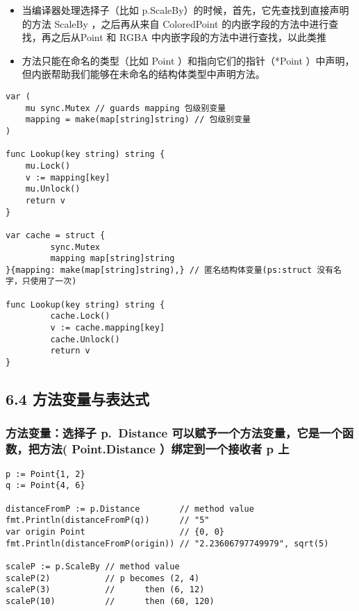 \begin{itemize}
\item
  当编译器处理选择子（比如
  p.ScaleBy）的时候，首先，它先查找到直接声明的方法 ScaleBy
  ，之后再从来自 ColoredPoint 的内嵌字段的方法中进行查找，再之后从Point
  和 RGBA 中内嵌字段的方法中进行查找，以此类推
\item
  方法只能在命名的类型（比如 Point ）和指向它们的指针（*Point
  ）中声明，但内嵌帮助我们能够在未命名的结构体类型中声明方法。
\end{itemize}

\begin{verbatim}
var (
    mu sync.Mutex // guards mapping 包级别变量
    mapping = make(map[string]string) // 包级别变量
)

func Lookup(key string) string {
    mu.Lock()
    v := mapping[key]
    mu.Unlock()
    return v
}

var cache = struct {
         sync.Mutex
         mapping map[string]string 
}{mapping: make(map[string]string),} // 匿名结构体变量(ps:struct 没有名字，只使用了一次)
         
func Lookup(key string) string {
         cache.Lock()
         v := cache.mapping[key]
         cache.Unlock()
         return v
}
\end{verbatim}

\hypertarget{ux65b9ux6cd5ux53d8ux91cfux4e0eux8868ux8fbeux5f0f}{%
\subsection{6.4
方法变量与表达式}\label{ux65b9ux6cd5ux53d8ux91cfux4e0eux8868ux8fbeux5f0f}}

\hypertarget{ux65b9ux6cd5ux53d8ux91cfux9009ux62e9ux5b50-p.distance-ux53efux4ee5ux8d4bux4e88ux4e00ux4e2aux65b9ux6cd5ux53d8ux91cfux5b83ux662fux4e00ux4e2aux51fdux6570ux628aux65b9ux6cd5-point.distance-ux7ed1ux5b9aux5230ux4e00ux4e2aux63a5ux6536ux8005-p-ux4e0a}{%
\subsubsection{方法变量：选择子 p.~Distance
可以赋予一个方法变量，它是一个函数，把方法( Point.Distance
）绑定到一个接收者 p
上}\label{ux65b9ux6cd5ux53d8ux91cfux9009ux62e9ux5b50-p.distance-ux53efux4ee5ux8d4bux4e88ux4e00ux4e2aux65b9ux6cd5ux53d8ux91cfux5b83ux662fux4e00ux4e2aux51fdux6570ux628aux65b9ux6cd5-point.distance-ux7ed1ux5b9aux5230ux4e00ux4e2aux63a5ux6536ux8005-p-ux4e0a}}

\begin{verbatim}
p := Point{1, 2}
q := Point{4, 6}

distanceFromP := p.Distance        // method value
fmt.Println(distanceFromP(q))      // "5"
var origin Point                   // {0, 0}
fmt.Println(distanceFromP(origin)) // "2.23606797749979", sqrt(5)

scaleP := p.ScaleBy // method value
scaleP(2)           // p becomes (2, 4)
scaleP(3)           //      then (6, 12)
scaleP(10)          //      then (60, 120)
\end{verbatim}

